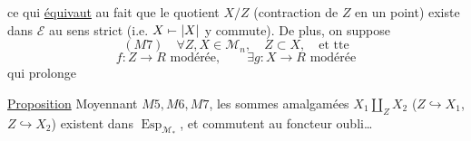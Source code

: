 

ce qui \uline{équivaut} au fait que le quotient $X/Z$ (contraction de $Z$ en un point) existe dans $\mathcal E$ au sens strict (i.e. $X\mathrel{\mapstochar\relbar}|X|$ y commute). De plus, on suppose
\[
(M7)\quad\forall Z,X\in\mathcal M_n,\quad Z\subset X,\quad\text{et tte}
\]
\[
f:Z\longrightarrow R\text{ modérée},\qquad\exists g:X\longrightarrow R\text{ modérée}
\]
qui prolonge 

\uline{Proposition} Moyennant $M5,M6,M7$, les sommes amalgamées $X_1\amalg_Z X_2$ ($Z\hookrightarrow X_1$, $Z\hookrightarrow X_2$) existent dans $\operatorname{Esp}_{\mathcal M_*}$, et commutent au foncteur oubli\ldots
{}

